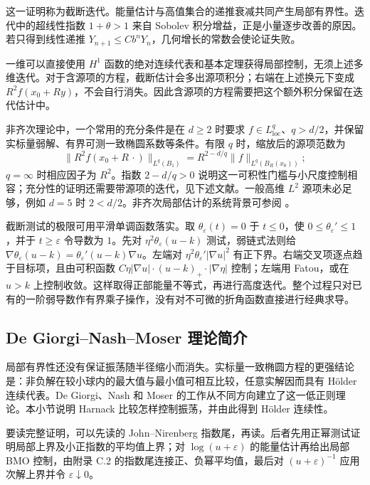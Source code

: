 这一证明称为截断迭代。能量估计与高值集合的递推衰减共同产生局部有界性。迭代中的超线性指数 \(1+\theta>1\) 来自 Sobolev 积分增益，正是小量逐步改善的原因。若只得到线性递推 \(Y_{n+1}\le Cb^nY_n\)，几何增长的常数会使论证失败。

\ProseParagraphBreak

一维可以直接使用 \(H^1\) 函数的绝对连续代表和基本定理获得局部控制，无须上述多维迭代。对于含源项的方程，截断估计会多出源项积分；右端在上述换元下变成 \(R^2f(x_0+Ry)\)，不会自行消失。因此含源项的方程需要把这个额外积分保留在迭代估计中。

非齐次理论中，一个常用的充分条件是在 \(d\geq2\) 时要求 \(f\in L^q_{\mathrm{loc}}\)、\(q>d/2\)，并保留实标量弱解、有界可测一致椭圆系数等条件。有限 \(q\) 时，缩放后的源项范数为
\[\|R^2f(x_0+R\,\cdot)\|_{L^q(B_1)}
 =R^{2-d/q}\|f\|_{L^q(B_R(x_0))};\]
\(q=\infty\) 时相应因子为 \(R^2\)。指数 \(2-d/q>0\) 说明这一可积性门槛与小尺度控制相容；充分性的证明还需要带源项的迭代，见下述文献。一般高维 \(L^2\) 源项未必足够，例如 \(d=5\) 时 \(2<d/2\)。非齐次局部估计的系统背景可参阅 \cite[Chapter 8]{Gilbarg2001Elliptic}。

截断测试的极限可用平滑单调函数落实。取 \(\theta_\varepsilon(t)=0\) 于 \(t\le0\)，使 \(0\le\theta_\varepsilon'\le1\)，并于 \(t\ge\varepsilon\) 令导数为 \(1\)。先对 \(\eta^2\theta_\varepsilon(u-k)\) 测试，弱链式法则给 \(\nabla\theta_\varepsilon(u-k)=\theta_\varepsilon'(u-k)\nabla u\)。左端对 \(\eta^2\theta_\varepsilon'|\nabla u|^2\) 有正下界。右端交叉项逐点趋于目标项，且由可积函数 \(C\eta|\nabla u|\cdot(u-k)_+\cdot|\nabla\eta|\) 控制；左端用 Fatou，或在 \(u>k\) 上控制收敛。这样取得正部能量不等式，再进行高度迭代。整个过程只对已有的一阶弱导数作有界乘子操作，没有对不可微的折角函数直接进行经典求导。

\subsection{De Giorgi–Nash–Moser 理论简介}
\label{b2:subsec:160404}

局部有界性还没有保证振荡随半径缩小而消失。实标量一致椭圆方程的更强结论是：非负解在较小球内的最大值与最小值可相互比较，任意实解因而具有 Hölder 连续代表。De Giorgi、Nash 和 Moser 的工作从不同方向建立了这一低正则理论。本小节说明 Harnack 比较怎样控制振荡，并由此得到 Hölder 连续性。

要读完整证明，可以先读的 John--Nirenberg 指数尾，再读。后者先用正幂测试证明局部上界及小正指数的平均值上界；对 \(\log(u+\varepsilon)\) 的能量估计再给出局部 BMO 控制，由附录 C.2 的指数尾连接正、负幂平均值，最后对 \((u+\varepsilon)^{-1}\) 应用次解上界并令 \(\varepsilon\downarrow0\)。

